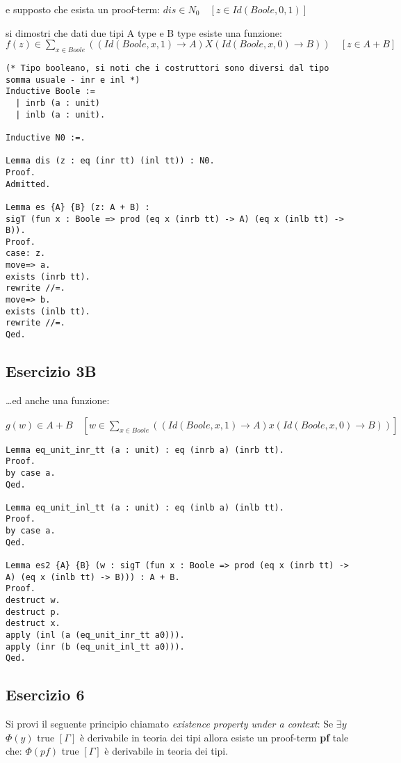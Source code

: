 e supposto che esista un proof-term:
$dis \in N_0 \quad [z \in Id(Boole, 0, 1)]$

si dimostri che dati due tipi A type e B type esiste una funzione:
$f(z) \in \sum_{x \in Boole} ( (Id(Boole, x, 1) \rightarrow A) X (Id(Boole, x, 0) \rightarrow B) ) \quad [ z \in A + B ]$

\begin{lstlisting}[language=Coq]
(* Tipo booleano, si noti che i costruttori sono diversi dal tipo somma usuale - inr e inl *)
Inductive Boole :=
  | inrb (a : unit)
  | inlb (a : unit).

Inductive N0 :=.

Lemma dis (z : eq (inr tt) (inl tt)) : N0.
Proof.
Admitted.

Lemma es {A} {B} (z: A + B) :
sigT (fun x : Boole => prod (eq x (inrb tt) -> A) (eq x (inlb tt) -> B)).
Proof.
case: z.
move=> a.
exists (inrb tt).
rewrite //=.
move=> b.
exists (inlb tt).
rewrite //=.
Qed.
\end{lstlisting}

\subsection{Esercizio 3B}

\dots ed anche una funzione:

$g(w) \in A + B \quad [w \in \sum_{x \in Boole} ( (Id(Boole, x, 1) \rightarrow A) x (Id(Boole, x, 0) \rightarrow B) )]$

\begin{lstlisting}[language=Coq]
Lemma eq_unit_inr_tt (a : unit) : eq (inrb a) (inrb tt).
Proof.
by case a.
Qed.

Lemma eq_unit_inl_tt (a : unit) : eq (inlb a) (inlb tt).
Proof.
by case a.
Qed.

Lemma es2 {A} {B} (w : sigT (fun x : Boole => prod (eq x (inrb tt) -> A) (eq x (inlb tt) -> B))) : A + B.
Proof.
destruct w.
destruct p.
destruct x.
apply (inl (a (eq_unit_inr_tt a0))).
apply (inr (b (eq_unit_inl_tt a0))).
Qed.
\end{lstlisting}

\subsection{Esercizio 6}

Si provi il seguente principio chiamato \textit{existence property under a context}:
Se $\exists y$ $\Phi(y)$ true $[\Gamma]$ è derivabile in teoria dei tipi allora
esiste un proof-term \textbf{pf} tale che: $\Phi(pf)$ true $[\Gamma]$ è
derivabile in teoria dei tipi.

